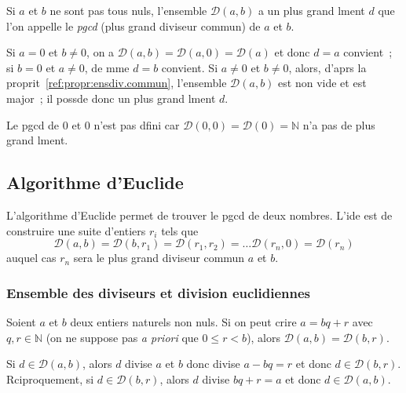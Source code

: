 \documentclass[a4paper,fleqn,openany]{trmbook}
\newcommand*{\N}{\mathbb{N}}
\newcommand*{\ensdiv}[1]{\mathcal{D}(#1)}
\newcommand*{\definir}[1]{\emph{#1}}
\begin{document}
\begin{theoreme}
Si $a$ et $b$ ne sont pas tous nuls, l'ensemble $\ensdiv{a,b}$ a un plus grand lment $d$ que l'on appelle le \definir{pgcd} (plus grand diviseur commun) de $a$ et $b$.
\end{theoreme}

\begin{demonstration}
Si $a = 0$ et $b \neq 0$, on a $\ensdiv{a,b} = \ensdiv{a,0} = \ensdiv{a}$ et donc $d = a$ convient~; si $b = 0$ et $a \neq 0$, de mme $d = b$ convient. Si $a \neq 0$ et $b \neq 0$, alors, d'aprs la proprit~\ref{ref:propr:ensdiv.commun}, l'ensemble $\ensdiv{a,b}$ est non vide et est major~; il possde donc un plus grand lment $d$.
\end{demonstration}

\begin{remarque}
Le pgcd de $0$ et $0$ n'est pas dfini car $\ensdiv{0,0} = \ensdiv{0} = \N$ n'a pas de plus grand lment.
\end{remarque}

\subsection{Algorithme d'Euclide}

L'algorithme d'Euclide permet de trouver le pgcd de deux nombres. L'ide est de construire une suite d'entiers $r_i$ tels que
\[\ensdiv{a,b} = \ensdiv{b,r_1} = \ensdiv{r_1,r_2} = \dots \ensdiv{r_n,0} = \ensdiv{r_n}\]
 auquel cas $r_n$ sera le plus grand diviseur commun  $a$ et $b$.

\subsubsection{Ensemble des diviseurs et division euclidiennes}

\begin{lemme}
Soient $a$ et $b$ deux entiers naturels non nuls. Si on peut crire $a = bq + r$ avec $q,r \in \N$ (on ne suppose pas \emph{a priori} que $0 \leq r < b$), alors $\ensdiv{a,b} = \ensdiv{b,r}$.
\end{lemme}

\begin{demonstration}
Si $d \in \ensdiv{a,b}$, alors $d$ divise $a$ et $b$ donc divise $a-bq = r$ et donc $d \in \ensdiv{b,r}$. Rciproquement, si $d \in \ensdiv{b,r}$, alors $d$ divise $bq+r = a$ et donc $d \in \ensdiv{a,b}$.
\end{demonstration}
\end{document}

